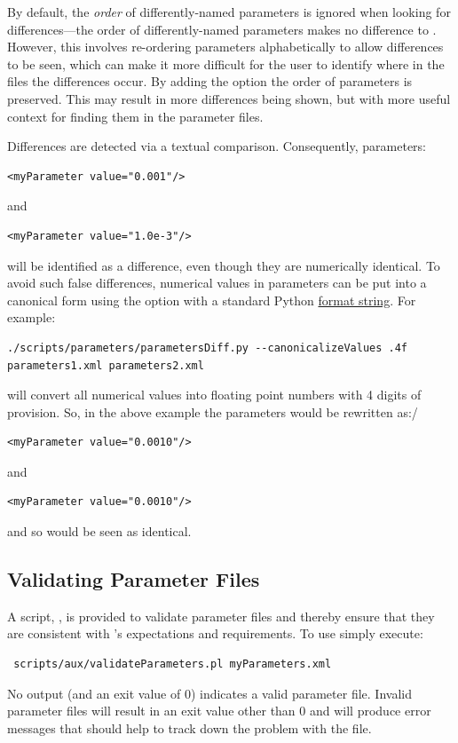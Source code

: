 By default, the \emph{order} of differently-named parameters is ignored when looking for differences---the order of differently-named parameters makes no difference to \glc. However, this involves re-ordering parameters alphabetically to allow differences to be seen, which can make it more difficult for the user to identify where in the files the differences occur. By adding the option  the order of parameters is preserved. This may result in more differences being shown, but with more useful context for finding them in the parameter files. 

Differences are detected via a textual comparison. Consequently, parameters:
\begin{verbatim}
<myParameter value="0.001"/>
\end{verbatim}
and
\begin{verbatim}
<myParameter value="1.0e-3"/>
\end{verbatim}
will be identified as a difference, even though they are numerically identical. To avoid such false differences, numerical values in parameters can be put into a canonical form using the  option with a standard Python \href{https://docs.python.org/3/library/string.html#formatstrings}{format string}. For example:
\begin{verbatim}
./scripts/parameters/parametersDiff.py --canonicalizeValues .4f parameters1.xml parameters2.xml
\end{verbatim}
will convert all numerical values into floating point numbers with 4 digits of provision. So, in the above example the parameters would be rewritten as:/
\begin{verbatim}
<myParameter value="0.0010"/>
\end{verbatim}
and
\begin{verbatim}
<myParameter value="0.0010"/>
\end{verbatim}
and so would be seen as identical.

\subsection{Validating Parameter Files}

A script, , is provided to validate parameter files and thereby ensure that they are consistent with \glc's expectations and requirements. To use simply execute:
\begin{verbatim}
 scripts/aux/validateParameters.pl myParameters.xml
\end{verbatim}
No output (and an exit value of 0) indicates a valid parameter file. Invalid parameter files will result in an exit value other than 0 and will produce error messages that should help to track down the problem with the file.

